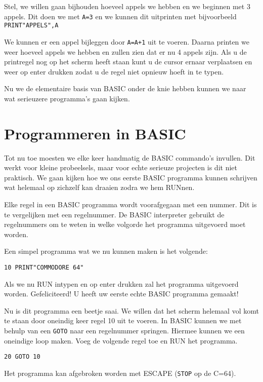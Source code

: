 \documentclass{article}
\begin{document}
Stel, we willen gaan bijhouden hoeveel appels we hebben en we beginnen met 3 appels.
Dit doen we met \verb:A=3: en we kunnen dit uitprinten met bijvoorbeeld \verb:PRINT"APPELS",A:

We kunnen er een appel bijleggen door \verb:A=A+1: uit te voeren.
Daarna printen we weer hoeveel appels we hebben en zullen zien dat er nu 4 appels zijn.
Als u de printregel nog op het scherm heeft staan kunt u de cursor ernaar verplaatsen en weer op enter drukken zodat u de regel niet opnieuw hoeft in te typen.

Nu we de elementaire basis van BASIC onder de knie hebben kunnen we naar wat serieuzere programma's gaan kijken.

\section{Programmeren in BASIC}

Tot nu toe moesten we elke keer handmatig de BASIC commando's invullen.
Dit werkt voor kleine probeelsels, maar voor echte serieuze projecten is dit niet praktisch.
We gaan kijken hoe we ons eerste BASIC programma kunnen schrijven wat helemaal op zichzelf kan draaien zodra we hem RUNnen.

Elke regel in een BASIC programma wordt voorafgegaan met een nummer.
Dit is te vergelijken met een regelnummer.
De BASIC interpreter gebruikt de regelnummers om te weten in welke volgorde het programma uitgevoerd moet worden.

Een simpel programma wat we nu kunnen maken is het volgende:

\begin{lstlisting}
10 PRINT"COMMODORE 64"
\end{lstlisting}

Als we nu RUN intypen en op enter drukken zal het programma uitgevoerd worden.
Gefeliciteerd! U heeft uw eerste echte BASIC programma gemaakt!

Nu is dit programma een beetje saai.
We willen dat het scherm helemaal vol komt te staan door oneindig keer regel 10 uit te voeren.
In BASIC kunnen we met behulp van een \verb:GOTO: naar een regelnummer springen.
Hiermee kunnen we een oneindige loop maken.
Voeg de volgende regel toe en RUN het programma.

\begin{lstlisting}
20 GOTO 10
\end{lstlisting}

Het programma kan afgebroken worden met ESCAPE (\verb:STOP: op de C=64).
\end{document}
